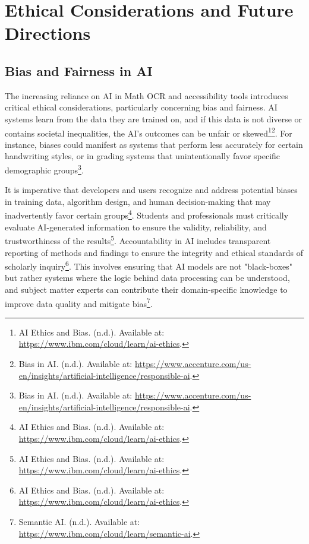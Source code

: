 \section{Ethical Considerations and Future Directions}
\subsection{Bias and Fairness in AI}
The increasing reliance on AI in Math OCR and accessibility tools introduces critical ethical considerations, particularly concerning bias and fairness. AI systems learn from the data they are trained on, and if this data is not diverse or contains societal inequalities, the AI's outcomes can be unfair or skewed\footnote{AI Ethics and Bias. (n.d.). Available at: \url{https://www.ibm.com/cloud/learn/ai-ethics}.}\footnote{Bias in AI. (n.d.). Available at: \url{https://www.accenture.com/us-en/insights/artificial-intelligence/responsible-ai}.}. For instance, biases could manifest as systems that perform less accurately for certain handwriting styles, or in grading systems that unintentionally favor specific demographic groups\footnote{Bias in AI. (n.d.). Available at: \url{https://www.accenture.com/us-en/insights/artificial-intelligence/responsible-ai}.}.

It is imperative that developers and users recognize and address potential biases in training data, algorithm design, and human decision-making that may inadvertently favor certain groups\footnote{AI Ethics and Bias. (n.d.). Available at: \url{https://www.ibm.com/cloud/learn/ai-ethics}.}. Students and professionals must critically evaluate AI-generated information to ensure the validity, reliability, and trustworthiness of the results\footnote{AI Ethics and Bias. (n.d.). Available at: \url{https://www.ibm.com/cloud/learn/ai-ethics}.}. Accountability in AI includes transparent reporting of methods and findings to ensure the integrity and ethical standards of scholarly inquiry\footnote{AI Ethics and Bias. (n.d.). Available at: \url{https://www.ibm.com/cloud/learn/ai-ethics}.}. This involves ensuring that AI models are not "black-boxes" but rather systems where the logic behind data processing can be understood, and subject matter experts can contribute their domain-specific knowledge to improve data quality and mitigate bias\footnote{Semantic AI. (n.d.). Available at: \url{https://www.ibm.com/cloud/learn/semantic-ai}.}.

